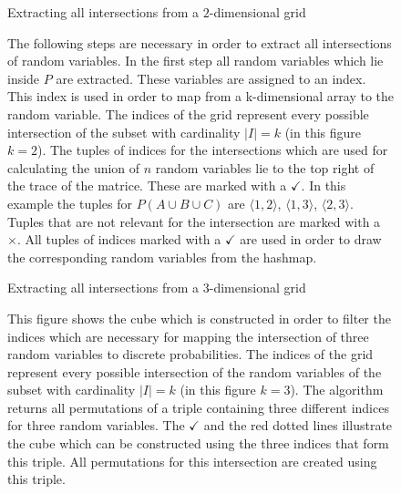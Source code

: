         \begin{center}
        \begin{figure}[H]
            
            \caption{Extracting all intersections from a $2$-dimensional grid}
            \caption*{The following steps are necessary in order to extract all intersections of random variables. In the first step all random variables which lie inside $P$
            are extracted. These variables are assigned to an index. This index is used in order to map from a k-dimensional array to the random variable.
            The indices of the grid represent every possible intersection of the subset with cardinality $|I| = k$ (in this figure $k=2$). The tuples of indices for the intersections which are used for calculating the union of $n$ random variables lie to the top right of the trace of the matrice.
            These are marked with a $\checkmark$. In this example the tuples for $P(A \cup B \cup C)$ are $\langle 1,2 \rangle$, $\langle 1,3 \rangle$, $\langle 2,3 \rangle$.
            Tuples that are not relevant for the intersection are marked with a $\times$. All tuples of indices marked with a $\checkmark$ are used in order to draw the corresponding random variables from the hashmap.}
        \label{intersectionofvariablesinsideagrid}
        \end{figure}
        \end{center}
        \begin{center}
        \begin{figure}[H]
            
            \caption{Extracting all intersections from a $3$-dimensional grid}
            \caption*{This figure shows the cube which is constructed in order to filter the indices which are necessary for mapping the intersection of three random variables to discrete probabilities.
            The indices of the grid represent every possible intersection of the random variables of the subset with cardinality $|I| = k$ (in this figure $k=3$). The algorithm returns all permutations of a triple containing
            three different indices for three random variables. The $\checkmark$ and the red dotted lines illustrate the cube which can be constructed using the three indices that form this triple.
            All permutations for this intersection are created using this triple.}
            \label{intersectionofvariablesinsideacube}
        \end{figure}
        \end{center}
